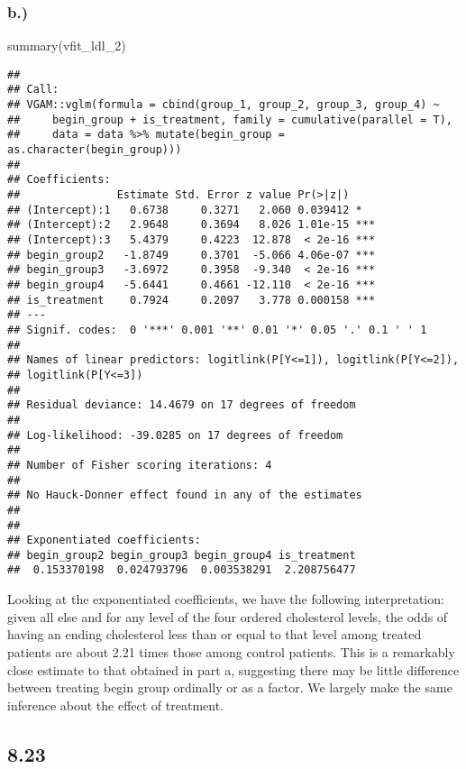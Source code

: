 \documentclass[
]{article}
\newenvironment{Shaded}{\begin{snugshade}}{\end{snugshade}}
\newcommand{\FunctionTok}[1]{\textcolor[rgb]{0.00,0.00,0.00}{#1}}
\newcommand{\NormalTok}[1]{#1}
\begin{document}
\hypertarget{b.-2}{%
\subsubsection{b.)}\label{b.-2}}

\begin{Shaded}
\begin{Highlighting}[]
\FunctionTok{summary}\NormalTok{(vfit\_ldl\_2)}
\end{Highlighting}
\end{Shaded}

\begin{verbatim}
## 
## Call:
## VGAM::vglm(formula = cbind(group_1, group_2, group_3, group_4) ~ 
##     begin_group + is_treatment, family = cumulative(parallel = T), 
##     data = data %>% mutate(begin_group = as.character(begin_group)))
## 
## Coefficients: 
##               Estimate Std. Error z value Pr(>|z|)    
## (Intercept):1   0.6738     0.3271   2.060 0.039412 *  
## (Intercept):2   2.9648     0.3694   8.026 1.01e-15 ***
## (Intercept):3   5.4379     0.4223  12.878  < 2e-16 ***
## begin_group2   -1.8749     0.3701  -5.066 4.06e-07 ***
## begin_group3   -3.6972     0.3958  -9.340  < 2e-16 ***
## begin_group4   -5.6441     0.4661 -12.110  < 2e-16 ***
## is_treatment    0.7924     0.2097   3.778 0.000158 ***
## ---
## Signif. codes:  0 '***' 0.001 '**' 0.01 '*' 0.05 '.' 0.1 ' ' 1
## 
## Names of linear predictors: logitlink(P[Y<=1]), logitlink(P[Y<=2]), 
## logitlink(P[Y<=3])
## 
## Residual deviance: 14.4679 on 17 degrees of freedom
## 
## Log-likelihood: -39.0285 on 17 degrees of freedom
## 
## Number of Fisher scoring iterations: 4 
## 
## No Hauck-Donner effect found in any of the estimates
## 
## 
## Exponentiated coefficients:
## begin_group2 begin_group3 begin_group4 is_treatment 
##  0.153370198  0.024793796  0.003538291  2.208756477
\end{verbatim}

Looking at the exponentiated coefficients, we have the following
interpretation: given all else and for any level of the four ordered
cholesterol levels, the odds of having an ending cholesterol less than
or equal to that level among treated patients are about 2.21 times those
among control patients. This is a remarkably close estimate to that
obtained in part a, suggesting there may be little difference between
treating begin group ordinally or as a factor. We largely make the same
inference about the effect of treatment.

\hypertarget{section-3}{%
\subsection{8.23}\label{section-3}}
\end{document}
